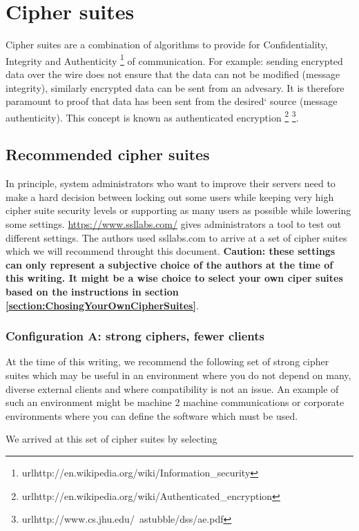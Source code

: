 \section{Cipher suites}

Cipher suites are a combination of algorithms to provide for 
Confidentiality, Integrity and Authenticity
\footnote{url{http://en.wikipedia.org/wiki/Information_security}} of 
communication. For example: sending encrypted data over the wire does not 
ensure that the data can not be modified (message integrity), similarly
encrypted data can be sent from an advesary. It is therefore paramount to
proof that data has been sent from the desired` source (message authenticity).
This concept is known as authenticated encryption
\footnote{url{http://en.wikipedia.org/wiki/Authenticated_encryption}}
\footnote{url{http://www.cs.jhu.edu/~astubble/dss/ae.pdf}}.

\subsection{Recommended cipher suites}

In principle, system administrators who want to improve their servers need to
make a hard decision between locking out some users while keeping very high
cipher suite security levels or supporting as many users as possible while
lowering some settings. \url{https://www.ssllabs.com/} gives administrators a
tool to test out different settings. The authors used ssllabs.com to arrive at
a set of cipher suites which we will recommend throught this document.
\textbf{Caution: these settings can only represent a subjective choice of the
authors at the time of this writing. It might be a wise choice to select your
own ciper suites based on the instructions in section
\ref{section:ChosingYourOwnCipherSuites}}.


\subsubsection{Configuration A: strong ciphers, fewer clients}

At the time of this writing, we recommend the following set of strong cipher
suites which may be useful in an environment where you do not depend on many,
diverse external clients and where compatibility is not an issue.  An example
of such an environment might be machine 2 machine communications or corporate
environments where you can define the software which must be used.


We arrived at this set of cipher suites by selecting

